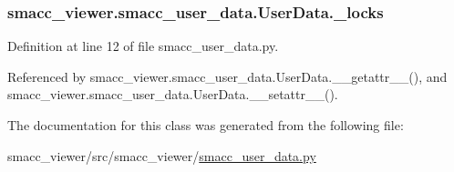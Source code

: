 \subsubsection[{\texorpdfstring{\+\_\+locks}{_locks}}]{\setlength{\rightskip}{0pt plus 5cm}smacc\+\_\+viewer.\+smacc\+\_\+user\+\_\+data.\+User\+Data.\+\_\+locks\hspace{0.3cm}{\ttfamily [private]}}\hypertarget{classsmacc__viewer_1_1smacc__user__data_1_1UserData_a53c6c29cad429091048d85d1f6eaba2f}{}\label{classsmacc__viewer_1_1smacc__user__data_1_1UserData_a53c6c29cad429091048d85d1f6eaba2f}


Definition at line 12 of file smacc\+\_\+user\+\_\+data.\+py.



Referenced by smacc\+\_\+viewer.\+smacc\+\_\+user\+\_\+data.\+User\+Data.\+\_\+\+\_\+getattr\+\_\+\+\_\+(), and smacc\+\_\+viewer.\+smacc\+\_\+user\+\_\+data.\+User\+Data.\+\_\+\+\_\+setattr\+\_\+\+\_\+().



The documentation for this class was generated from the following file\+:\begin{DoxyCompactItemize}
\item 
smacc\+\_\+viewer/src/smacc\+\_\+viewer/\hyperlink{smacc__user__data_8py}{smacc\+\_\+user\+\_\+data.\+py}\end{DoxyCompactItemize}

